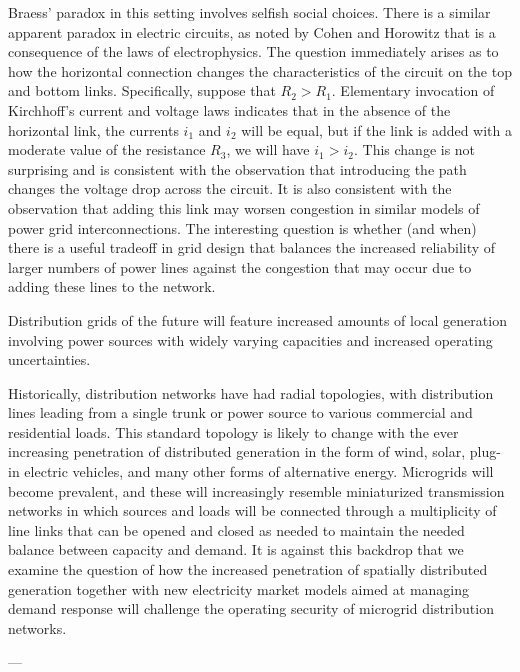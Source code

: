 Braess' paradox in this setting involves selfish social choices. There is a similar apparent paradox in electric circuits, as noted by Cohen and Horowitz that is a consequence of the laws of electrophysics. The question immediately arises as to how the horizontal connection changes the characteristics of the circuit on the top and bottom links. Specifically, suppose that $R_2>R_1$. Elementary invocation of Kirchhoff's current and voltage laws indicates that in the absence of the horizontal link, the currents $i_1$ and $i_2$ will be equal, but if the link is added with a moderate value of the resistance $R_3$, we will have $i_1>i_2$. This change is not surprising and is consistent with the observation that introducing the path changes the voltage drop across the circuit. It is also consistent with the observation that adding this link may worsen congestion in similar models of power grid interconnections. The interesting question is whether (and when) there is a useful tradeoff in grid design that balances the increased reliability of larger numbers of power lines against the congestion that may occur due to adding these lines to the network.

Distribution grids of the future will feature increased amounts of local generation involving power sources with widely varying capacities and increased operating uncertainties.

Historically, distribution networks have had radial topologies, with distribution lines leading from a single trunk or power source to various commercial and residential loads. This standard topology is likely to change with the ever increasing penetration of distributed generation in the form of wind, solar, plug-in electric vehicles, and many other forms of alternative energy. Microgrids will become prevalent, and these will increasingly resemble miniaturized transmission networks in which sources and loads will be connected through a multiplicity of line links that can be opened and closed as needed to maintain the needed balance between capacity and demand. It is against this backdrop that we examine the question of how the increased penetration of spatially distributed generation together with new electricity market models aimed at managing demand response will challenge the operating security of microgrid distribution networks.

---

